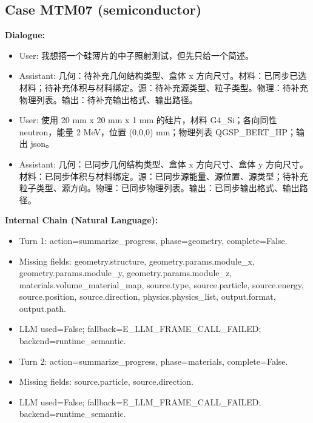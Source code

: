 \documentclass[11pt]{ctexart}
\begin{document}
\subsection{Case MTM07 (semiconductor)}
\textbf{Dialogue:}
\begin{itemize}
\item User: 我想搭一个硅薄片的中子照射测试，但先只给一个简述。
\item Assistant: 几何：待补充几何结构类型、盒体 x 方向尺寸。材料：已同步已选材料；待补充体积与材料绑定。源：待补充源类型、粒子类型。物理：待补充物理列表。输出：待补充输出格式、输出路径。
\item User: 使用 20 mm x 20 mm x 1 mm 的硅片，材料 G4\_Si；各向同性 neutron，能量 2 MeV，位置 (0,0,0) mm；物理列表 QGSP\_BERT\_HP；输出 json。
\item Assistant: 几何：已同步几何结构类型、盒体 x 方向尺寸、盒体 y 方向尺寸。材料：已同步体积与材料绑定。源：已同步源能量、源位置、源类型；待补充粒子类型、源方向。物理：已同步物理列表。输出：已同步输出格式、输出路径。
\end{itemize}
\textbf{Internal Chain (Natural Language):}
\begin{itemize}
\item Turn 1: action=summarize\_progress, phase=geometry, complete=False.
\item Missing fields: geometry.structure, geometry.params.module\_x, geometry.params.module\_y, geometry.params.module\_z, materials.volume\_material\_map, source.type, source.particle, source.energy, source.position, source.direction, physics.physics\_list, output.format, output.path.
\item LLM used=False; fallback=E\_LLM\_FRAME\_CALL\_FAILED; backend=runtime\_semantic.
\item Turn 2: action=summarize\_progress, phase=materials, complete=False.
\item Missing fields: source.particle, source.direction.
\item LLM used=False; fallback=E\_LLM\_FRAME\_CALL\_FAILED; backend=runtime\_semantic.
\end{itemize}
\end{document}
